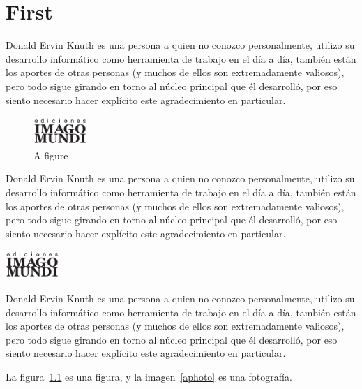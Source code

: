\documentclass{book}
\begin{document}
% 
% 

\chapter{First}

Donald Ervin Knuth es una persona a quien no conozco personalmente, utilizo su desarrollo informático como herramienta de trabajo en el día a día, también están los aportes de otras personas (y muchos de ellos son extremadamente valiosos), pero todo sigue girando en torno al núcleo principal que él desarrolló, por eso siento necesario hacer explícito este agradecimiento en particular.

\begin{figure}[!ht]
\centering
\includegraphics[width=20mm]{logo-imago-cmyk.pdf}
\caption{A figure}
\label{afig}
\end{figure}

Donald Ervin Knuth es una persona a quien no conozco personalmente, utilizo su desarrollo informático como herramienta de trabajo en el día a día, también están los aportes de otras personas (y muchos de ellos son extremadamente valiosos), pero todo sigue girando en torno al núcleo principal que él desarrolló, por eso siento necesario hacer explícito este agradecimiento en particular.

\begin{Imagen}[!ht]
\centering
\includegraphics[width=20mm]{logo-imago-cmyk.pdf}
\caption{A photograph}
\label{aphoto}
\end{Imagen}

Donald Ervin Knuth es una persona a quien no conozco personalmente, utilizo su desarrollo informático como herramienta de trabajo en el día a día, también están los aportes de otras personas (y muchos de ellos son extremadamente valiosos), pero todo sigue girando en torno al núcleo principal que él desarrolló, por eso siento necesario hacer explícito este agradecimiento en particular.

La figura~\ref{afig} es una figura, y la imagen~\ref{aphoto} es una fotografía.
\end{document}
